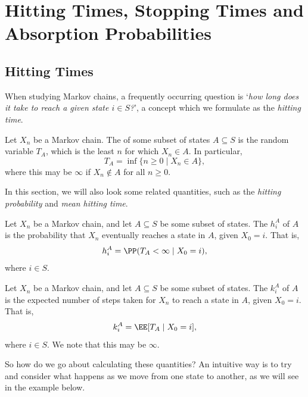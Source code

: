 \documentclass[a4paper]{scrartcl}
\begin{document}
\section{Hitting Times, Stopping Times and Absorption Probabilities}

\subsection{Hitting Times}

When studying Markov chains, a frequently occurring question is `\emph{how long does it take to reach a given state $i \in S$?}', a concept which we formulate as the \emph{hitting time}.

\begin{definition}
	Let $X_n$ be a Markov chain.
	The  of some subset of states $A \subseteq S$ is the random variable $T_A$, which is the least $n$ for which $X_n \in A$.
	In particular,
	$$
	T_A = \inf\{n \geq 0 \mid X_n \in A\},
	$$
	where this may be $\infty$ if $X_n \not \in A$ for all $n \geq 0$.
\end{definition}

In this section, we will also look some related quantities, such as the \emph{hitting probability} and \emph{mean hitting time}.

\begin{definition}
	Let $X_n$ be a Markov chain, and let $A \subseteq S$ be some subset of states.
	The  $h^A_i$ of $A$ is the probability that $X_n$ eventually reaches a state in $A$, given $X_0 = i$. That is,
	$$
	h^A_i = \PP(T_A < \infty \mid X_0 = i),
	$$
	where $i \in S$.
\end{definition}

\begin{definition}
	Let $X_n$ be a Markov chain, and let $A \subseteq S$ be some subset of states.
	The  $k^A_i$ of $A$ is the expected number of steps taken for $X_n$ to reach a state in $A$, given $X_0 = i$. That is,
	$$
	k^A_i = \EE[T_A \mid X_0 = i],
	$$
	where $i \in S$. We note that this may be $\infty$.
\end{definition}

So how do we go about calculating these quantities? An intuitive way is to try and consider what happens as we move from one state to another, as we will see in the example below.
\end{document}
